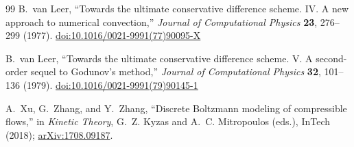 \documentclass[11pt]{article}
\begin{document}
\begin{thebibliography}{99}
B.~van Leer, ``Towards the ultimate conservative difference scheme. IV. A new approach to
numerical convection,'' \emph{Journal of Computational Physics} \textbf{23}, 276--299 (1977).
\href{https://doi.org/10.1016/0021-9991(77)90095-X}{doi:10.1016/0021-9991(77)90095-X}

B.~van Leer, ``Towards the ultimate conservative difference scheme. V. A second-order
sequel to Godunov's method,'' \emph{Journal of Computational Physics} \textbf{32}, 101--136
(1979).
\href{https://doi.org/10.1016/0021-9991(79)90145-1}{doi:10.1016/0021-9991(79)90145-1}

A.~Xu, G.~Zhang, and Y.~Zhang, ``Discrete Boltzmann modeling of compressible flows,'' in
\emph{Kinetic Theory}, G.~Z. Kyzas and A.~C. Mitropoulos (eds.), InTech (2018);
\href{https://arxiv.org/abs/1708.09187}{arXiv:1708.09187}.
\end{thebibliography}
\end{document}
